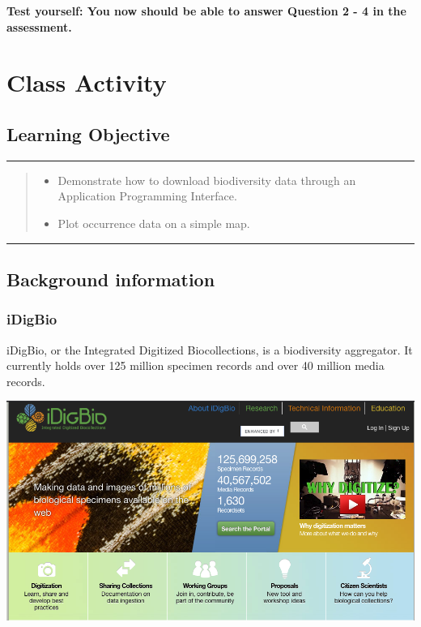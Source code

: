 \documentclass[
]{book}
\providecommand{\tightlist}{%
  \setlength{\itemsep}{0pt}\setlength{\parskip}{0pt}}
\begin{document}
\textbf{Test yourself: You now should be able to answer Question 2 - 4 in the assessment.}

\hypertarget{class-activity}{%
\chapter{Class Activity}\label{class-activity}}

\hypertarget{learning-objective-2}{%
\section{Learning Objective}\label{learning-objective-2}}

\begin{center}\rule{0.5\linewidth}{0.5pt}\end{center}

\begin{quote}
\begin{itemize}
\tightlist
\item
  Demonstrate how to download biodiversity data through an Application Programming Interface.
\item
  Plot occurrence data on a simple map.
\end{itemize}
\end{quote}

\begin{center}\rule{0.5\linewidth}{0.5pt}\end{center}

\hypertarget{background-information}{%
\section{Background information}\label{background-information}}

\hypertarget{idigbio}{%
\subsection{iDigBio}\label{idigbio}}

iDigBio, or the Integrated Digitized Biocollections, is a biodiversity aggregator. It currently holds over 125 million specimen records and over 40 million media records.

\begin{center}\includegraphics[width=0.7\linewidth]{img/idigbio} \end{center}
\end{document}
